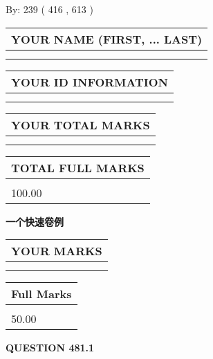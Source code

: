 \documentclass{ctexart}
\begin{document}
   
\hspace{1.0in} By: 
 239 ( 416 ,  613 )
   
   
   
   
\newpage 
\setcounter{page}{ 
   481001 } 
   
   
   
   
\noindent\begin{tabular}{|l|}
\hline
YOUR NAME (FIRST, ... LAST)  \\
\hline
 \\ 
 \\ 
\hline
\end{tabular}
\hspace{0.05in} \begin{tabular}{|l|}
\hline
 YOUR   ID   INFORMATION  \\
\hline
 \\ 
 \\ 
\hline
\end{tabular}
   
   
\vspace{0.2in}\noindent\begin{tabular}{|l|}
\hline
YOUR TOTAL MARKS  \\
\hline
 \\ 
 \\ 
\hline
\end{tabular}
\hspace{0.05in} \begin{tabular}{|l|}
\hline
TOTAL FULL MARKS  \\
\hline
 \\ 
100.00 \\
\hline
\end{tabular}
   
   
 \vspace{0.2in}
{\LARGE {\textbf{ 一个快速卷例}}}
   
   
  
\vspace{0.2in}
  
\noindent\begin{tabular}{|l|}
\hline
 YOUR MARKS  \\
\hline
 \\ 
 \\ 
\hline
\end{tabular}
\hspace{0.05in} \begin{tabular}{|l|}
\hline
 Full Marks  \\
\hline
 \\ 
50.00 \\
\hline
\end{tabular}
{\textbf{\Large{QUESTION
481.1 
}}}
  
\end{document}
